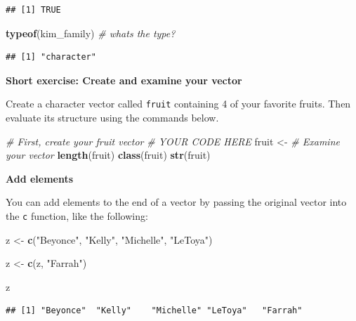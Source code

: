 \documentclass[
]{book}
\newenvironment{Shaded}{\begin{snugshade}}{\end{snugshade}}
\newcommand{\CommentTok}[1]{\textcolor[rgb]{0.56,0.35,0.01}{\textit{#1}}}
\newcommand{\FunctionTok}[1]{\textcolor[rgb]{0.13,0.29,0.53}{\textbf{#1}}}
\newcommand{\NormalTok}[1]{#1}
\newcommand{\OtherTok}[1]{\textcolor[rgb]{0.56,0.35,0.01}{#1}}
\newcommand{\StringTok}[1]{\textcolor[rgb]{0.31,0.60,0.02}{#1}}
\begin{document}
\begin{verbatim}
## [1] TRUE
\end{verbatim}

\begin{Shaded}
\begin{Highlighting}[]
\FunctionTok{typeof}\NormalTok{(kim\_family) }\CommentTok{\# what\textquotesingle{}s the type?}
\end{Highlighting}
\end{Shaded}

\begin{verbatim}
## [1] "character"
\end{verbatim}

\textbf{Short exercise: Create and examine your vector}

Create a character vector called \texttt{fruit} containing 4 of your favorite fruits. Then evaluate its structure using the commands below.

\begin{Shaded}
\begin{Highlighting}[]
\CommentTok{\# First, create your fruit vector}
\CommentTok{\# YOUR CODE HERE}
\NormalTok{fruit }\OtherTok{\textless{}{-}}
  \CommentTok{\# Examine your vector}
  \FunctionTok{length}\NormalTok{(fruit)}
\FunctionTok{class}\NormalTok{(fruit)}
\FunctionTok{str}\NormalTok{(fruit)}
\end{Highlighting}
\end{Shaded}

\textbf{Add elements}

You can add elements to the end of a vector by passing the original vector into the \texttt{c} function, like the following:

\begin{Shaded}
\begin{Highlighting}[]
\NormalTok{z }\OtherTok{\textless{}{-}} \FunctionTok{c}\NormalTok{(}\StringTok{"Beyonce"}\NormalTok{, }\StringTok{"Kelly"}\NormalTok{, }\StringTok{"Michelle"}\NormalTok{, }\StringTok{"LeToya"}\NormalTok{)}

\NormalTok{z }\OtherTok{\textless{}{-}} \FunctionTok{c}\NormalTok{(z, }\StringTok{"Farrah"}\NormalTok{)}

\NormalTok{z}
\end{Highlighting}
\end{Shaded}

\begin{verbatim}
## [1] "Beyonce"  "Kelly"    "Michelle" "LeToya"   "Farrah"
\end{verbatim}
\end{document}
